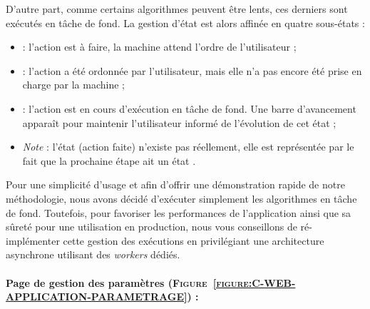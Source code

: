 		D'autre part, comme certains algorithmes peuvent être lents, ces derniers sont exécutés en tâche de fond.
		La gestion d'état est alors affinée en quatre sous-états :
		\begin{itemize}
			\item {} : l'action est à faire, la machine attend l'ordre de l'utilisateur ;
			\item {} : l'action a été ordonnée par l'utilisateur, mais elle n'a pas encore été prise en charge par la machine ;
			\item {} : l'action est en cours d'exécution en tâche de fond.
			Une barre d'avancement apparaît pour maintenir l'utilisateur informé de l'évolution de cet état ;
			\item \textit{Note} : l'état  (action faite) n'existe pas réellement, elle est représentée par le fait que la prochaine étape ait un état .
		\end{itemize}
		
		\begin{leftBarWarning}
			Pour une simplicité d'usage et afin d'offrir une démonstration rapide de notre méthodologie, nous avons décidé d'exécuter simplement les algorithmes en tâche de fond.
			Toutefois, pour favoriser les performances de l'application ainsi que sa sûreté pour une utilisation en production, nous vous conseillons de ré-implémenter cette gestion des exécutions en privilégiant une architecture asynchrone utilisant des \textit{workers} dédiés.
		\end{leftBarWarning}
	
	
	\newpage
	\paragraph{Page de gestion des paramètres (\textsc{Figure~\ref{figure:C-WEB-APPLICATION-PARAMETRAGE}}) :}
	
